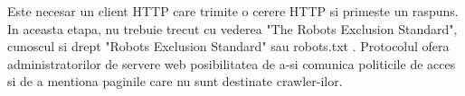 Este necesar un client HTTP care trimite o cerere HTTP si primeste un raspuns. In aceasta etapa, nu trebuie trecut cu vederea "The Robots Exclusion Standard", cunoscul si drept "Robots Exclusion Standard" sau robots.txt \cite{RobotsStandard}. Protocolul ofera administratorilor de servere web posibilitatea de a-si comunica politicile de acces si de a mentiona paginile care nu sunt destinate crawler-ilor.
\\